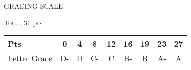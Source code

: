 \documentclass[12pt,letterpaper,titlepage]{report}
\begin{document}
\begin{raggedright}
\vspace{\fill}
\noindent
GRADING SCALE
\medskip

Total: 31 pts
\bigskip

\def\arraystretch{1.5}
\begin{tabular}{ | l | c | c | c | c | c | c | c | c | } \hline
Pts          & 0  & 4  & 8  & 12 & 16 & 19 & 23 & 27     \\\hline
Letter Grade & D- & D  & C- & C  & B- & B  & A- & A      \\\hline
\end{tabular}
\end{raggedright}
\end{document}
